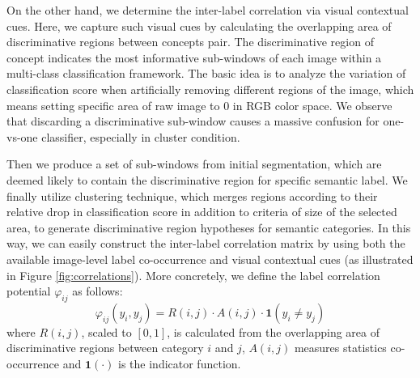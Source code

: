 On the other hand, we determine the inter-label correlation via visual contextual cues. Here, we capture such visual cues by calculating the overlapping area of discriminative regions between concepts pair. The discriminative region of concept indicates the most informative sub-windows of each image within a multi-class classification framework.
The basic idea is to analyze the variation of classification score when artificially removing different regions of the image, which means setting specific area of raw image to 0 in RGB color space. We observe that discarding a discriminative sub-window causes a massive confusion for one-vs-one classifier, especially in cluster condition.

Then we produce a set of sub-windows from initial segmentation, which are deemed likely to contain the discriminative region for specific semantic label. We finally utilize clustering technique, which merges regions according to their relative drop in classification score in addition to criteria of size of the selected area, to generate discriminative region hypotheses for semantic categories. In this way, we can easily construct the inter-label correlation matrix by using both the available image-level label co-occurrence and visual contextual cues (as illustrated in Figure \ref{fig:correlations}).
More concretely, we define the label correlation potential $\varphi_{ij}$ as follows:
\begin{equation}
    \varphi_{ij}(y_i,y_j) = R(i,j) \cdot A(i,j) \cdot \mathbf{1}(y_i \neq y_j)
\end{equation}
where $R(i,j)$, scaled to $[0,1]$, is calculated from the overlapping area of discriminative regions between category $i$ and $j$, $A(i,j)$ measures statistics co-occurrence and $\mathbf{1}(\cdot)$ is the indicator function.

